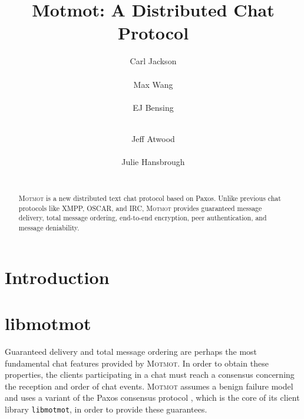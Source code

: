 \documentclass{sig-alternate}
\newcommand\Motmot{\textsc{Motmot}\xspace}
\begin{document}

\title{Motmot: A Distributed Chat Protocol}

%
\author{
  \alignauthor
  Carl Jackson \\
     \\
  \alignauthor
  Max Wang \\
     \\
  \alignauthor
  EJ Bensing \\
     \\
  \and
  \alignauthor
  Jeff Atwood \\
     \\
  \alignauthor
  Julie Hansbrough \\
     \\
}

\maketitle

\begin{abstract}

\Motmot is a new distributed text chat protocol based on Paxos. Unlike previous
chat protocols like XMPP, OSCAR, and IRC, \Motmot provides guaranteed message
delivery, total message ordering, end-to-end encryption, peer authentication,
and message deniability.

\end{abstract}

\section{Introduction}

\section{libmotmot}

Guaranteed delivery and total message ordering are perhaps the most fundamental
chat features provided by \Motmot.  In order to obtain these properties, the
clients participating in a chat must reach a consensus concerning the reception
and order of chat events.  \Motmot assumes a benign failure model and uses a
variant of the Paxos consensus protocol \cite{paxos}, which is the core of its
client library \texttt{libmotmot}, in order to provide these guarantees.
\end{document}
